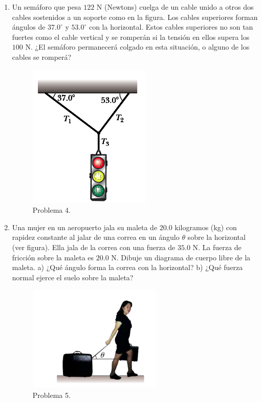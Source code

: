 \documentclass{article}
\begin{document}
\begin{enumerate}
\item Un semáforo que pesa $122$ N (Newtons) cuelga de un cable unido a otros dos cables sostenidos a un soporte como en la figura. Los cables superiores forman ángulos de $37$.$0^{\circ}$ y $53$.$0^{\circ}$ con la horizontal. Estos cables superiores no son tan fuertes como el cable vertical y se romperán si la tensión en ellos supera los
$100$ N. ¿El semáforo permanecerá colgado en esta situación, o alguno de los cables se romperá?

\begin{figure}[H]
\centering
\includegraphics[scale=0.4]{problema_4.png}
\caption{Problema 4.}
\end{figure}

\item Una mujer en un aeropuerto jala su maleta de $20$.$0$ kilogramos (kg) con rapidez constante al jalar de una correa en un ángulo $\theta $ sobre la horizontal (ver figura). Ella jala de la correa con una fuerza de $35$.$0$ N. La fuerza de fricción sobre la maleta es $20$.$0$ N. Dibuje un diagrama de cuerpo libre de la maleta. a) ¿Qué ángulo forma la correa con la horizontal? b) ¿Qué fuerza normal ejerce el suelo sobre la maleta?

\begin{figure}[H]
\centering
\includegraphics[scale=0.5]{problema_5.png}
\caption{Problema 5.}
\end{figure}


\end{enumerate}
\end{document}
